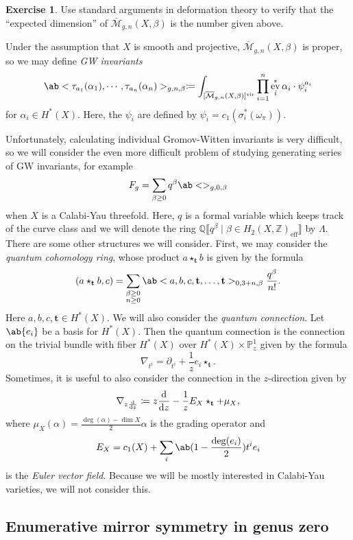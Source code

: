 \documentclass{amsart}
\theoremstyle{definition}
\newtheorem{exer}[thm]{Exercise}
\theoremstyle{remark}
\theoremstyle{plain}
\theoremstyle{definition}
\theoremstyle{remark}
\newcommand{\Z}{\mathbb{Z}}
\newcommand{\Q}{\mathbb{Q}}
\renewcommand{\P}{\mathbb{P}}
\newcommand{\Mbar}{\overline{\mathcal{M}}}
\newcommand{\mbf}[1]{\mathbf{#1}}
\newcommand{\mr}[1]{\mathrm{#1}}
\newcommand{\1}{\mathbf{1}}
\newcommand{\2}{\mathbf{2}}
\newcommand{\3}{\mathbf{3}}
\newcommand{\vir}{\mr{vir}}
\newcommand{\ps}[1]{\llbracket #1 \rrbracket}
\DeclareMathOperator{\ev}{ev}
\begin{document}
\begin{exer}
    Use standard arguments in deformation theory to verify that the ``expected dimension'' of \(\Mbar_{g,n}(X, \beta)\) is the number given above.
\end{exer}

Under the assumption that \(X\) is smooth and projective, \(\Mbar_{g,n}(X, \beta)\) is proper, so we may define \textit{GW invariants}
\[ \ab<\tau_{a_1}(\alpha_1), \cdots, \tau_{a_n}(\alpha_n)>_{g,n,\beta} \coloneqq \int_{[\Mbar_{g,n}(X, \beta)]^{\vir}} \prod_{i=1}^n \ev_i^* \alpha_i \cdot \psi_i^{a_i} \]
for \(\alpha_i \in H^*(X)\). Here, the \(\psi_i\) are defined by \(\psi_i = c_1(\sigma_i^*(\omega_{\pi}))\).

Unfortunately, calculating individual Gromov-Witten invariants is very difficult, so we will consider the even more difficult problem of studying generating series of GW invariants, for example
\[ F_g = \sum_{\beta \geq 0} q^{\beta} \ab<>_{g,0,\beta} \]
when \(X\) is a Calabi-Yau threefold. Here, \(q\) is a formal variable which keeps track of the curve class and we will denote the ring \(\Q\ps{q^{\beta} \mid \beta \in H_2(X, \Z)_{\mr{eff}}}\) by \(\Lambda\). There are some other structures we will consider. First, we may consider the \textit{quantum cohomology ring}, whose product \(a \star_{\mbf{t}} b\) is given by the formula 
\[
    (a \star_{\mbf{t}} b, c) = \sum_{\substack{\beta \geq 0 \\ n \geq 0}} \ab<a,b,c, \mbf{t}, \ldots, \mbf{t}>_{0,3+n,\beta} \frac{q^{\beta}}{n!}.
\]
Here \(a,b,c, \mbf{t} \in H^*(X)\). We will also consider the \textit{quantum connection}. Let \(\ab\{ e_i \}\) be a basis for \(H^*(X)\). Then the quantum connection is the connection on the trivial bundle with fiber \(H^*(X)\) over \(H^*(X) \times \P^1_z\) given by the formula
\[ \nabla_{t^i} = \partial_{t^i} + \frac{1}{z} e_i \star_{\mbf{t}}. \]
Sometimes, it is useful to also consider the connection in the \(z\)-direction given by 
\[ \nabla_{z \odv{}{z}} \coloneqq z \odv{}{z} - \frac{1}{z} E_X \star_{\mbf{t}} + \mu_X, \]
where \(\mu_X(\alpha) = \frac{\deg(\alpha) - \dim X}{2} \alpha\) is the grading operator and
\[ E_X = c_1(X) + \sum_i \ab(1 - \frac{\deg(e_i)}{2})t^i e_i \]
is the \textit{Euler vector field}. Because we will be mostly interested in Calabi-Yau varieties, we will not consider this.

\subsection{Enumerative mirror symmetry in genus zero}%
\label{sub:Enumerative mirror symmetry in genus zero}
\end{document}
